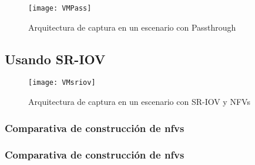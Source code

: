 \begin{figure}[!htb]
\centering
\texttt{[image: VMPass]}
\caption{Arquitectura de captura en un escenario con Passthrough} 
\label{fig:vmpass}
\end{figure}

\subsection{Usando SR-IOV\label{sec:sriov}}

\begin{figure}[!htb]
\centering
\texttt{[image: VMsriov]}
\caption{Arquitectura de captura en un escenario con SR-IOV y NFVs}
\label{fig:vmsriov} 
\end{figure}


\subsubsection{Comparativa de construcción de \glspl{nfv}}


\subsubsection{Comparativa de construcción de \glspl{nfv}}